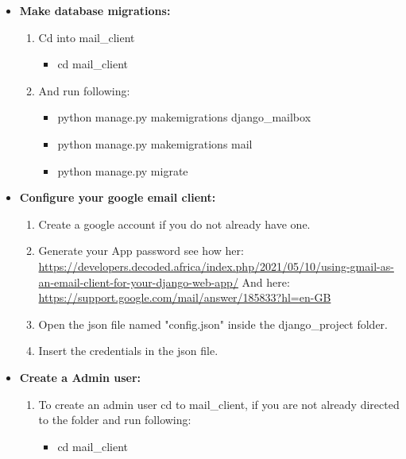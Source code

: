 \documentclass{article}
\begin{document}
\begin{itemize}
    \item \textbf{Make database migrations: } 
    \begin{enumerate}
        \item Cd into mail\_client
        
        \begin{itemize}
        \item cd mail\_client
        \end{itemize}
        
        \item And run following:
        
        \begin{itemize}
        \item python manage.py makemigrations django\_mailbox 
        \item python manage.py makemigrations mail
        \item python manage.py migrate
        \end{itemize}

    \end{enumerate}
    \item \textbf{Configure your google email client: } 
    \begin{enumerate}
        \item Create a google account if you do not already have one.
        \item Generate your App password see how her: \url{https://developers.decoded.africa/index.php/2021/05/10/using-gmail-as-an-email-client-for-your-django-web-app/}
        And here: \url{https://support.google.com/mail/answer/185833?hl=en-GB}
        
        \item Open the json file named "config.json" inside the django\_project folder.
        \item Insert the credentials in the json file.

    \end{enumerate}
    \item \textbf{Create a Admin user: } 
    \begin{enumerate}
        \item To create an admin user cd to mail_client, if you are not already directed to the folder
        and run following:
        
        \begin{itemize}
        \item cd mail\_client
        

\end{itemize}
\end{enumerate}
\end{itemize}
\end{document}
